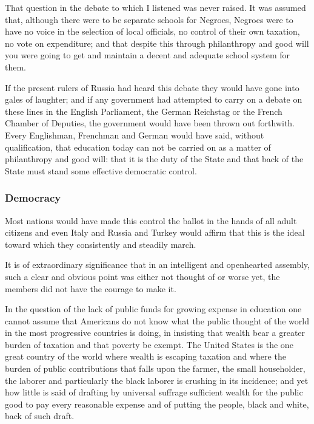 \documentclass[letterpaper,10pt,english]{jupyterBook}
\begin{document}
\sphinxAtStartPar
That question in the debate to which I listened was never raised. It was assumed that, although there were to be separate schools for Negroes, Negroes were to have no voice in the selection of local officials, no control of their own taxation, no vote on expenditure; and that despite this through philanthropy and good will you were going to get and maintain a decent and adequate school system for them.

\sphinxAtStartPar
If the present rulers of Russia had heard this debate they would have gone into gales of laughter; and if any government had attempted to carry on a debate on these lines in the English Parliament, the German Reichstag or the French Chamber of Deputies, the government would have been thrown out forthwith. Every Englishman, Frenchman and German would have said, without qualification, that education today can not be carried on as a matter of philanthropy and good will: that it is the duty of the State and that back of the State must stand some effective democratic control.


\subsubsection{Democracy}
\label{\detokenize{Volumes/36/05/negro_citizen:democracy}}
\sphinxAtStartPar
Most nations would have made this control the ballot in the hands of all adult citizens and even Italy and Russia and Turkey would affirm that this is the ideal toward which they consistently and steadily march.

\sphinxAtStartPar
It is of extraordinary significance that in an intelligent and open\sphinxhyphen{}hearted assembly, such a clear and obvious point was either not thought of or worse yet, the members did not have the courage to make it.

\sphinxAtStartPar
In the question of the lack of public funds for growing expense in education one cannot assume that Americans do not know what the public thought of the world in the most progressive countries is doing, in insisting that wealth bear a greater burden of taxation and that poverty be exempt. The United States is the one great country of the world where wealth is escaping taxation and where the burden of public contributions that falls upon the farmer, the small householder, the laborer and particularly the black laborer is crushing in its incidence; and yet how little is said of drafting by universal suffrage sufficient wealth for the public good to pay every reasonable expense and of putting the people, black and white, back of such draft.
\end{document}
